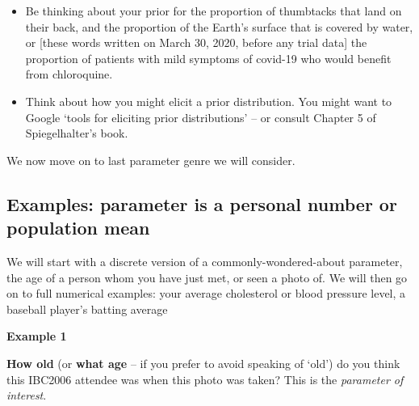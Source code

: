 \documentclass[]{book}
\begin{document}
\begin{itemize}
\item
  Be thinking about your prior for the proportion of thumbtacks that land on their back, and the proportion of the Earth's surface that is covered by water, or {[}these words written on March 30, 2020, before any trial data{]} the proportion of patients with mild symptoms of covid-19 who would benefit from chloroquine.
\item
  Think about how you might elicit a prior distribution. You might want to Google `tools for eliciting prior distributions' -- or consult Chapter 5 of Spiegelhalter's book.
\end{itemize}

We now move on to last parameter genre we will consider.

\hypertarget{examples-parameter-is-a-personal-number-or-population-mean}{%
\subsection{Examples: parameter is a personal number or population mean}\label{examples-parameter-is-a-personal-number-or-population-mean}}

We will start with a discrete version of a commonly-wondered-about parameter,
the age of a person whom you have just met, or seen a photo of.
We will then go on to full numerical examples: your average cholesterol or blood pressure level, a baseball player's batting average

\textbf{Example 1}

\textbf{How old} (or \textbf{what age} -- if you prefer to avoid speaking of `old') do you think this IBC2006 attendee was when this photo was taken? This is the \emph{parameter of interest}.
\end{document}
